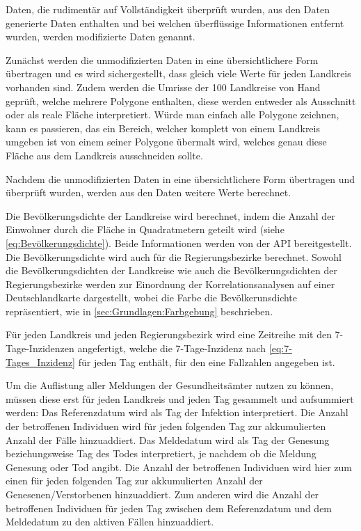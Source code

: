 Daten, die rudimentär auf Vollständigkeit überprüft wurden, aus den Daten generierte Daten enthalten und bei welchen überflüssige Informationen entfernt wurden, werden \glqq{}modifizierte\grqq{} Daten genannt.

Zunächst werden die unmodifizierten Daten in eine übersichtlichere Form übertragen und es wird sichergestellt, dass gleich viele Werte für jeden Landkreis vorhanden sind. Zudem werden die Umrisse der 100 Landkreise von Hand geprüft, welche mehrere Polygone enthalten, diese werden entweder als Ausschnitt oder als reale Fläche interpretiert. Würde man einfach alle Polygone zeichnen, kann es passieren, das ein Bereich, welcher komplett von einem Landkreis umgeben ist von einem seiner Polygone übermalt wird, welches genau diese Fläche aus dem Landkreis ausschneiden sollte.

Nachdem die unmodifizierten Daten in eine übersichtlichere Form übertragen und überprüft wurden, werden aus den Daten weitere Werte berechnet.

Die Bevölkerungsdichte der Landkreise wird berechnet, indem die Anzahl der Einwohner durch die Fläche in Quadratmetern geteilt wird (siehe \autoref{eq:Bevölkerungsdichte}). Beide Informationen werden von der API bereitgestellt.
Die Bevölkerungsdichte wird auch für die Regierungsbezirke berechnet. 
Sowohl die Bevölkerungsdichten der Landkreise wie auch die Bevölkerungsdichten der Regierungsbezirke werden zur Einordnung der Korrelationsanalysen auf einer Deutschlandkarte dargestellt, wobei die Farbe die Bevölkerunsdichte repräsentiert, wie in \autoref{sec:Grundlagen:Farbgebung} beschrieben.

Für jeden Landkreis und jeden Regierungsbezirk wird eine Zeitreihe mit den 7-Tage-Inzidenzen angefertigt, welche die 7-Tage-Inzidenz nach \autoref{eq:7-Tages_Inzidenz} für jeden Tag enthält, für den eine Fallzahlen angegeben ist. 

Um die Auflistung aller Meldungen der Gesundheitsämter nutzen zu können, müssen diese erst für jeden Landkreis und jeden Tag gesammelt und aufsummiert werden:
Das Referenzdatum wird als Tag der Infektion interpretiert. Die Anzahl der betroffenen Individuen wird für jeden folgenden Tag zur akkumulierten Anzahl der Fälle hinzuaddiert.
Das Meldedatum wird als Tag der Genesung beziehungsweise Tag des Todes interpretiert, je nachdem ob die Meldung Genesung oder Tod angibt. Die Anzahl der betroffenen Individuen wird hier zum einen für jeden folgenden Tag zur akkumulierten Anzahl der Genesenen/Verstorbenen hinzuaddiert. Zum anderen wird die Anzahl der betroffenen Individuen für jeden Tag zwischen dem Referenzdatum und dem Meldedatum zu den aktiven Fällen hinzuaddiert.

